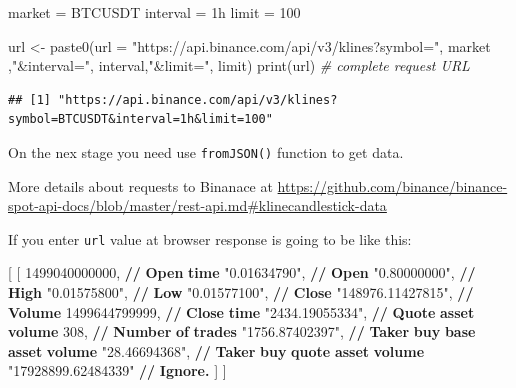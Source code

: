 \documentclass[
]{book}
\newenvironment{Shaded}{\begin{snugshade}}{\end{snugshade}}
\newcommand{\AttributeTok}[1]{\textcolor[rgb]{0.77,0.63,0.00}{#1}}
\newcommand{\CommentTok}[1]{\textcolor[rgb]{0.56,0.35,0.01}{\textit{#1}}}
\newcommand{\DecValTok}[1]{\textcolor[rgb]{0.00,0.00,0.81}{#1}}
\newcommand{\ErrorTok}[1]{\textcolor[rgb]{0.64,0.00,0.00}{\textbf{#1}}}
\newcommand{\FunctionTok}[1]{\textcolor[rgb]{0.00,0.00,0.00}{#1}}
\newcommand{\NormalTok}[1]{#1}
\newcommand{\OtherTok}[1]{\textcolor[rgb]{0.56,0.35,0.01}{#1}}
\newcommand{\StringTok}[1]{\textcolor[rgb]{0.31,0.60,0.02}{#1}}
\begin{document}
\begin{Shaded}
\begin{Highlighting}[]
\NormalTok{market }\OtherTok{=} \StringTok{\textquotesingle{}BTCUSDT\textquotesingle{}}
\NormalTok{interval }\OtherTok{=} \StringTok{\textquotesingle{}1h\textquotesingle{}}
\NormalTok{limit }\OtherTok{=} \DecValTok{100}

\NormalTok{url }\OtherTok{\textless{}{-}} \FunctionTok{paste0}\NormalTok{(}\AttributeTok{url =} \StringTok{"https://api.binance.com/api/v3/klines?symbol="}\NormalTok{, market ,}\StringTok{"\&interval="}\NormalTok{, interval,}\StringTok{"\&limit="}\NormalTok{, limit)}
\FunctionTok{print}\NormalTok{(url) }\CommentTok{\# complete request URL}
\end{Highlighting}
\end{Shaded}

\begin{verbatim}
## [1] "https://api.binance.com/api/v3/klines?symbol=BTCUSDT&interval=1h&limit=100"
\end{verbatim}

On the nex stage you need use \texttt{fromJSON()} function to get data.

More details about requests to Binanace at \url{https://github.com/binance/binance-spot-api-docs/blob/master/rest-api.md\#klinecandlestick-data}

If you enter \texttt{url} value at browser response is going to be like this:

\begin{Shaded}
\begin{Highlighting}[]
\OtherTok{[}
  \OtherTok{[}
    \DecValTok{1499040000000}\OtherTok{,}      \ErrorTok{//} \ErrorTok{Open} \ErrorTok{time}
    \StringTok{"0.01634790"}\OtherTok{,}       \ErrorTok{//} \ErrorTok{Open}
    \StringTok{"0.80000000"}\OtherTok{,}       \ErrorTok{//} \ErrorTok{High}
    \StringTok{"0.01575800"}\OtherTok{,}       \ErrorTok{//} \ErrorTok{Low}
    \StringTok{"0.01577100"}\OtherTok{,}       \ErrorTok{//} \ErrorTok{Close}
    \StringTok{"148976.11427815"}\OtherTok{,}  \ErrorTok{//} \ErrorTok{Volume}
    \DecValTok{1499644799999}\OtherTok{,}      \ErrorTok{//} \ErrorTok{Close} \ErrorTok{time}
    \StringTok{"2434.19055334"}\OtherTok{,}    \ErrorTok{//} \ErrorTok{Quote} \ErrorTok{asset} \ErrorTok{volume}
    \DecValTok{308}\OtherTok{,}                \ErrorTok{//} \ErrorTok{Number} \ErrorTok{of} \ErrorTok{trades}
    \StringTok{"1756.87402397"}\OtherTok{,}    \ErrorTok{//} \ErrorTok{Taker} \ErrorTok{buy} \ErrorTok{base} \ErrorTok{asset} \ErrorTok{volume}
    \StringTok{"28.46694368"}\OtherTok{,}      \ErrorTok{//} \ErrorTok{Taker} \ErrorTok{buy} \ErrorTok{quote} \ErrorTok{asset} \ErrorTok{volume}
    \StringTok{"17928899.62484339"} \ErrorTok{//} \ErrorTok{Ignore.}
  \OtherTok{]}
\OtherTok{]}
\end{Highlighting}
\end{Shaded}
\end{document}
